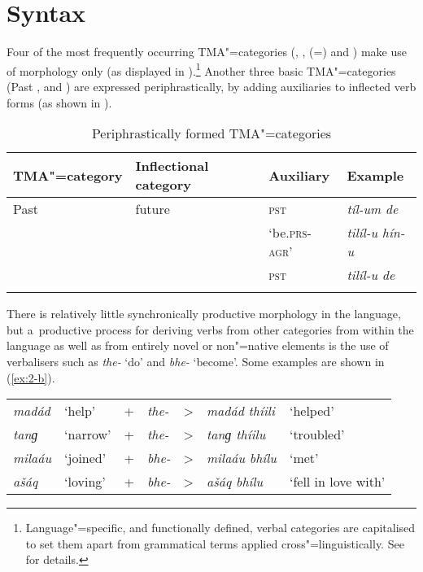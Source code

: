 \section{Syntax}
\label{sec:2-3}
Four of the most frequently occurring TMA"=categories (, ,  (=) and ) make use of  morphology only (as displayed in ).\footnote{Language"=specific, and functionally defined, verbal categories are capitalised to set them apart from grammatical terms applied cross"=linguistically. See  for details.} Another three basic TMA"=categories (Past ,  and ) are expressed periphrastically, by adding auxiliaries to inflected verb forms (as shown in ).


\begin{table}[ht]
\caption{Periphrastically formed TMA"=categories}
\begin{tabularx}{\textwidth}{ l l Q Q }
\lsptoprule
TMA"=category &
Inflectional category &
Auxiliary &
Example \\\midrule
Past  &
future &
\textsc{pst} &
\textit{tíl-um de} \\
 &
 &
`be.\textsc{prs-agr}' &
\textit{tilíl-u hín-u} \\
 &
 &
\textsc{pst} &
\textit{tilíl-u de} \\\lspbottomrule
\end{tabularx}
\label{tab:2-peri}
\end{table}


There is relatively little synchronically productive  morphology in the language, but a~productive process for deriving verbs from other categories from within the language as well as from entirely novel or non"=native elements is the use of verbalisers such as \textit{the-} `do' and \textit{bhe-} `become'. Some examples are shown in (\ref{ex:2-b}).


\begin{exe}
\extab
\label{ex:2-b}
\begin{tabularx}{116mm}{ l l l l l l l}
\textit{madád} &
`help' &
+ &
\textit{the-} &
{\textgreater} &
\textit{madád thíili} &
`helped'\\
\textit{tanɡ} &
`narrow' &
+ &
\textit{the-} &
{\textgreater} &
\textit{tanɡ thíilu} &
`troubled'\\
\textit{milaáu} &
`joined' &
+ &
\textit{bhe-} &
{\textgreater} &
\textit{milaáu bhílu} &
`met'\\
\textit{ašáq} &
`loving' &
+ &
\textit{bhe-} &
{\textgreater} &
\textit{ašáq bhílu} &
`fell in love with'\\
\end{tabularx}
\end{exe}


